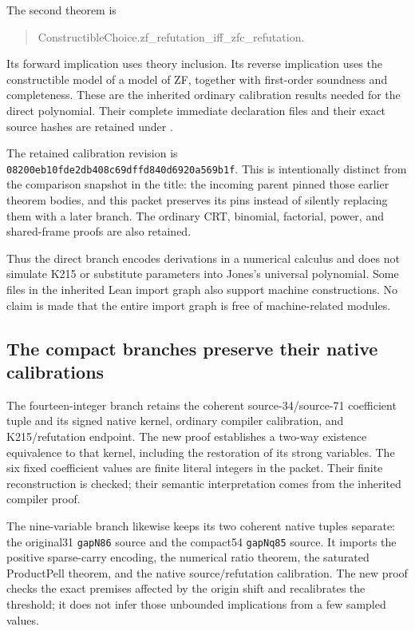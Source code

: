 \documentclass[11pt,a4paper]{article}
\theoremstyle{definition}
\begin{document}
The second theorem is
\begin{quote}\small\ttfamily
ConstructibleChoice.zf\_refutation\_iff\_zfc\_refutation.
\end{quote}
Its forward implication uses theory inclusion. Its reverse implication
uses the constructible model of a model of ZF, together with first-order
soundness and completeness. These are the inherited ordinary calibration
results needed for the direct polynomial. Their complete immediate
declaration files and their exact source hashes are retained under
.

The retained calibration revision is
\texttt{08200eb10fde2db408c69dffd840d6920a569b1f}. This is intentionally
distinct from the comparison snapshot in the title: the incoming parent
pinned those earlier theorem bodies, and this packet preserves its pins
instead of silently replacing them with a later branch. The ordinary CRT,
binomial, factorial, power, and shared-frame proofs are also retained.

Thus the direct branch encodes derivations in a numerical calculus and
does not simulate K215 or substitute parameters into Jones's universal
polynomial. Some files in the inherited Lean import graph also support
machine constructions. No claim is made that the entire import graph is
free of machine-related modules.

\subsection{The compact branches preserve their native calibrations}

The fourteen-integer branch retains the coherent source-34/source-71
coefficient tuple and its signed native kernel, ordinary compiler
calibration, and K215/refutation endpoint. The new proof establishes a
two-way existence equivalence to that kernel, including the restoration
of its strong variables. The six fixed coefficient values are finite
literal integers in the packet. Their finite reconstruction is checked;
their semantic interpretation comes from the inherited compiler proof.

The nine-variable branch likewise keeps its two coherent native tuples
separate: the original31 \texttt{gapN86} source and the compact54
\texttt{gapNq85} source. It imports the positive sparse-carry encoding,
the numerical ratio theorem, the saturated ProductPell theorem, and the
native source/refutation calibration. The new proof checks the exact
premises affected by the origin shift and recalibrates the threshold;
it does not infer those unbounded implications from a few sampled values.
\end{document}
